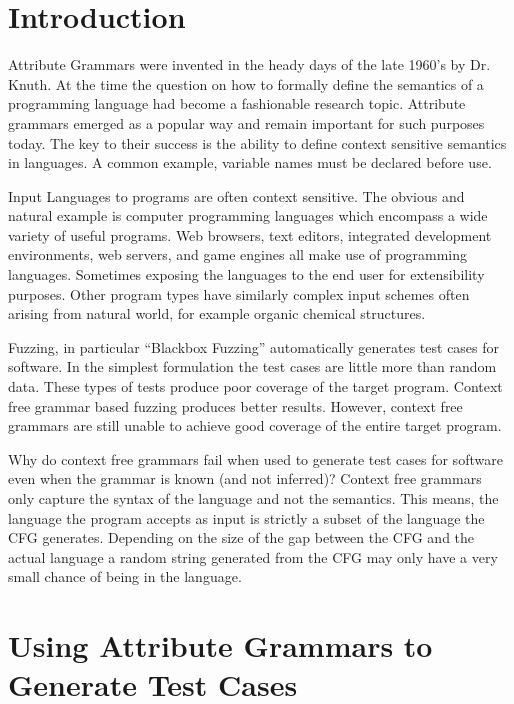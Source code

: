 \begin{multicols}{2}

\section{Introduction}

Attribute Grammars were invented in the heady days of the late 1960's by Dr.
Knuth.\cite{Knuth1990} At the time the question on how to formally define the
semantics of a programming language had become a fashionable research topic.
Attribute grammars emerged as a popular way and remain important for such
purposes today. The key to their success is the ability to define context
sensitive semantics in languages. A common example, variable names must be
declared before use.

Input Languages to programs are often context sensitive. The obvious and natural
example is computer programming languages which encompass a wide variety of
useful programs. Web browsers, text editors, integrated development environments,
web servers, and game engines all make use of programming languages. Sometimes
exposing the languages to the end user for extensibility purposes. Other program
types have similarly complex input schemes often arising from natural world,
for example organic chemical structures.

Fuzzing, in particular ``Blackbox Fuzzing'' automatically generates test cases
for software. In the simplest formulation the test cases are little more than
random data. These types of tests produce poor coverage of the target program.
Context free grammar based fuzzing produces better results. However, context
free grammars are still unable to achieve good coverage of the entire target
program. 

Why do context free grammars fail when used to generate test cases for software
even when the grammar is known (and not inferred)? Context free grammars only
capture the syntax of the language and not the semantics. This means, the
language the program accepts as input is strictly a subset of the language the
CFG generates. Depending on the size of the gap between the CFG and the actual
language a random string generated from the CFG may only have a very small
chance of being in the language.

\section{Using Attribute Grammars to Generate Test Cases}


\end{multicols}
